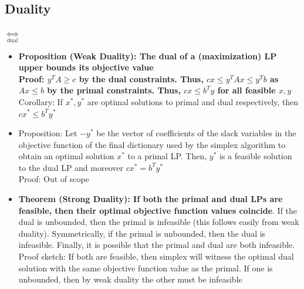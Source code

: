 \documentclass[20pt,a4paper,landscape]{extarticle}
\renewcommand{\mathbb}{\mathds}
\begin{document}
\begin{flushleft}
\subsection{Duality}
\vspace{-18pt}
\begin{lpformulation}
\lpeq*{x_{r+1}, ..., x_n \in \mathbb{R}}{}
\end{lpformulation}
$\underset{\textrm{dual}}{\Leftrightarrow}$
\vspace{-8pt}
\begin{lpformulation}
\lpeq*{y_{d+1}, ..., y_m \in \mathbb{R}}{}
\end{lpformulation}
\begin{itemize}
\item \textbf{Proposition (Weak Duality): The dual of a (maximization) LP upper bounds its objective value}\\
\textbf{Proof: \boldmath$y^TA \geq c$ by the dual constraints. Thus, $cx \leq y^TAx \leq y^Tb$ as $Ax \leq b$ by the primal constraints. Thus, $cx \leq b^Ty$ for all feasible $x, y$}\\
Corollary: If $x^\ast, y^\ast$ are optimal solutions to primal and dual respectively, then $cx^\ast \leq b^Ty^\ast$
\item Proposition: Let $-y^\ast$ be the vector of coefficients of the slack variables in the objective function of the final dictionary used by the simplex algorithm to obtain an optimal solution $x^\ast$ to a primal LP. Then, $y^\ast$ is a feasible solution to the dual LP and moreover $cx^\ast = b^Ty^\ast$\\
Proof: Out of scope
\clearpage
\item \textbf{Theorem (Strong Duality): If both the primal and dual LPs are feasible, then their optimal objective function values coincide}. If the dual is unbounded, then the primal is infeasible (this follows easily from weak duality). Symmetrically, if the primal is unbounded, then the dual is infeasible. Finally, it is possible that the primal and dual are both infeasible.\\
Proof sketch:
If both are feasible, then simplex will witness the optimal dual solution with the same objective function value as the primal. If one is unbounded, then by weak duality the other must be infeasible

\end{itemize}
\end{flushleft}
\end{document}
